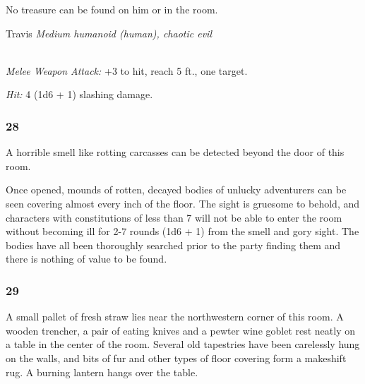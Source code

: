 \documentclass[palace_of_the_silver_princess]{subfiles}
\begin{document}
No treasure can be found on him or in the room.

\begin{monsterbox}{Travis}
    \textit{Medium humanoid (human), chaotic evil}\\
    \hline
    \basics[%
        armorclass = 12,
        hitpoints  = 11 (2d8 + 2),
        speed      = {30 ft.}
    ]
    \hline
    \stats[
        STR = \stat{11},
        DEX = \stat{12},
        CON = \stat{12},
        INT = \stat{10},
        WIS = \stat{10},
        CHA = \stat{10}
    ]
    \hline
    \details[
        senses = {passive Perception 10},
        languages = {Common},
        challenge = {1/8 (25 XP)},
    ]
    \hline
    \\[1mm]
    \begin{monsteraction}
        \textit{Melee Weapon Attack:} +3 to hit, reach 5 ft., one
        target.

        \textit{Hit:} 4 (1d6 + 1) slashing damage.
    \end{monsteraction}
\end{monsterbox}

\subsubsection{28}
\begin{quotebox}
    A horrible smell like rotting carcasses can be detected beyond the
    door of this room.
\end{quotebox}

Once opened, mounds of rotten, decayed bodies of unlucky adventurers can
be seen covering almost every inch of the floor. The sight is gruesome
to behold, and characters with constitutions of less than 7 will not be
able to enter the room without becoming ill for 2-7 rounds (1d6 + 1)
from the smell and gory sight. The bodies have all been thoroughly
searched prior to the party finding them and there is nothing of value
to be found.

\subsubsection{29}
\begin{quotebox}
    A small pallet of fresh straw lies near the northwestern corner of
    this room. A wooden trencher, a pair of eating knives and a pewter
    wine goblet rest neatly on a table in the center of the room.
    Several old tapestries have been carelessly hung on the walls, and
    bits of fur and other types of floor covering form a makeshift
    rug. A burning lantern hangs over the table.
\end{quotebox}
\end{document}
